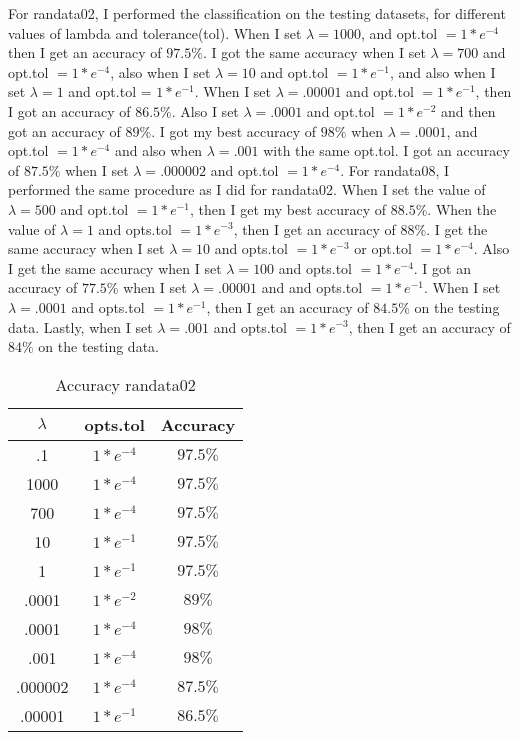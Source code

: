 \documentclass[11pt]{article}
\begin{document}
  For randata02, I performed the 
classification on the testing datasets, for different values of lambda and tolerance(tol). When I set $
\lambda = 1000$, and opt.tol $= 1*e^{-4}$ then I get an accuracy of $97.5\%$. I got the same accuracy 
when 
I set $\lambda= 700$ and opt.tol $= 1*e^{-4}$, also when I set $\lambda = 10$ and opt.tol $= 1*e^{-1}$, 
and 
also when I set $\lambda = 1$ and opt.tol = $1*e^{-1}$. When I set $\lambda = .00001$ and opt.tol $= 
1*e^{-1}$, then I got an accuracy of $86.5\%$. Also I set $\lambda = .0001$ and opt.tol $= 1*e^{-2}$ and 
then got an accuracy of $89\%$. I got my best accuracy of $98\%$ when $\lambda=.0001$, and opt.tol $= 
1*e^{-4}$ and also when $\lambda=.001$ with the same opt.tol. I got an accuracy of $87.5\%$ when I set $
\lambda= .000002$ and opt.tol $= 1*e^{-4}$. For randata08, I performed the same procedure as I did for 
randata02. When I set the value of $\lambda=500$ and opt.tol $= 1*e^{-1}$, then I get my best accuracy 
of 
$88.5\%$. When the value of $\lambda=1$ and opts.tol $= 1*e^{-3}$, then I get an accuracy of $88\%$. I 
get 
the same accuracy when I set $\lambda=10$ and opts.tol $= 1*e^{-3}$ or opt.tol $= 1*e^{-4}$. Also I get 
the 
same accuracy when I set $\lambda=100$ and opts.tol $= 1*e^{-4}$. I got an accuracy of $77.5\%$ when I 
set  
$\lambda=.00001$ and and opts.tol $= 1*e^{-1}$. When I set  $\lambda=.0001$ and  opts.tol $= 1*e^{-1}$, 
then I get an accuracy of $84.5\%$ on the testing data. Lastly, when I set $\lambda=.001$ and  opts.tol 
$= 
1*e^{-3}$, then I get an accuracy of $84\%$ on the testing data.
\bigskip
\begin{table}[ht]
\caption{Accuracy randata02}
\centering 
\begin{tabular}{c c c} 
\hline\hline 
$\lambda$ & opts.tol & Accuracy \\ [0.5ex]
\hline
.1 & $1*e^{-4}$ & $97.5\%$ \\
1000 & $1*e^{-4}$ & $97.5\%$ \\
700 & $1*e^{-4}$ & $97.5\%$ \\
10 & $1*e^{-1}$ & $97.5\%$ \\
1 & $1*e^{-1}$ & $97.5\%$ \\
.0001 & $1*e^{-2}$ & $89\%$ \\
.0001 & $1*e^{-4}$ & $98\%$ \\
.001 & $1*e^{-4}$ & $98\%$ \\
.000002 & $1*e^{-4}$ & $87.5\%$ \\
.00001 & $1*e^{-1}$ & $86.5\%$ \\
\hline 
\end{tabular}
\end{table}
\end{document}
